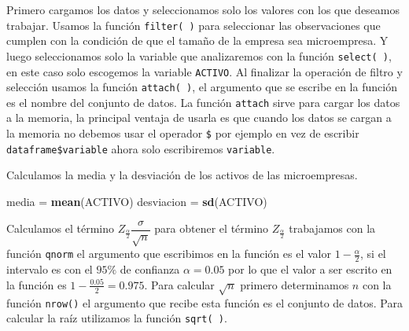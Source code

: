 \documentclass[
]{krantz}
\makeatletter
\newenvironment{Shaded}{\begin{snugshade}}{\end{snugshade}}
\newcommand{\DataTypeTok}[1]{\textcolor[rgb]{0.27,0.27,0.27}{#1}}
\newcommand{\KeywordTok}[1]{\textcolor[rgb]{0.27,0.27,0.27}{\textbf{#1}}}
\newcommand{\NormalTok}[1]{#1}
\newcommand{\OperatorTok}[1]{\textcolor[rgb]{0.43,0.43,0.43}{\textbf{#1}}}
\newcommand{\OtherTok}[1]{\textcolor[rgb]{0.37,0.37,0.37}{#1}}
\newcommand{\StringTok}[1]{\textcolor[rgb]{0.5,0.5,0.5}{#1}}
\newenvironment{kframe}{%
\medskip{}
\setlength{\fboxsep}{.8em}
 \def\at@end@of@kframe{}%
 \ifinner\ifhmode%
  \def\at@end@of@kframe{\end{minipage}}%
  \begin{minipage}{\columnwidth}%
 \fi\fi%
 \def\FrameCommand##1{\hskip\@totalleftmargin \hskip-\fboxsep
 \colorbox{shadecolor}{##1}\hskip-\fboxsep
     \hskip-\linewidth \hskip-\@totalleftmargin \hskip\columnwidth}%
 \MakeFramed {\advance\hsize-\width
   \@totalleftmargin\z@ \linewidth\hsize
   \@setminipage}}%
 {\par\unskip\endMakeFramed%
 \at@end@of@kframe}
\renewenvironment{Shaded}{\begin{kframe}}{\end{kframe}}
\makeatother
\begin{document}
Primero cargamos los datos y seleccionamos solo los valores con los que deseamos trabajar. Usamos la función \texttt{filter(\ )} para seleccionar las observaciones que cumplen con la condición de que el tamaño de la empresa sea microempresa. Y luego seleccionamos solo la variable que analizaremos con la función \texttt{select(\ )}, en este caso solo escogemos la variable \texttt{ACTIVO}. Al finalizar la operación de filtro y selección usamos la función \texttt{attach(\ )}, el argumento que se escribe en la función es el nombre del conjunto de datos. La función \texttt{attach} sirve para cargar los datos a la memoria, la principal ventaja de usarla es que cuando los datos se cargan a la memoria no debemos usar el operador \texttt{\$} por ejemplo en vez de escribir \texttt{dataframe\$variable} ahora solo escribiremos \texttt{variable}.

\begin{Shaded}
\end{Shaded}

Calculamos la media y la desviación de los activos de las microempresas.

\begin{Shaded}
\begin{Highlighting}[]
\NormalTok{media =}\StringTok{ }\KeywordTok{mean}\NormalTok{(ACTIVO)}
\NormalTok{desviacion =}\StringTok{ }\KeywordTok{sd}\NormalTok{(ACTIVO)}
\end{Highlighting}
\end{Shaded}

Calculamos el término \(Z_{\frac{\alpha}{2}}\dfrac{\sigma}{\sqrt{n}}\) para obtener el término \(Z_{\frac{\alpha}{2}}\) trabajamos con la función \texttt{qnorm} el argumento que escribimos en la función es el valor \(1-\frac{\alpha}{2}\), si el intervalo es con el \(95\%\) de confianza \(\alpha=0.05\) por lo que el valor a ser escrito en la función es \(1-\frac{0.05}{2}=0.975\). Para calcular \(\sqrt{n}\) primero determinamos \(n\) con la función \texttt{nrow()} el argumento que recibe esta función es el conjunto de datos. Para calcular la raíz utilizamos la función \texttt{sqrt(\ )}.
\end{document}
